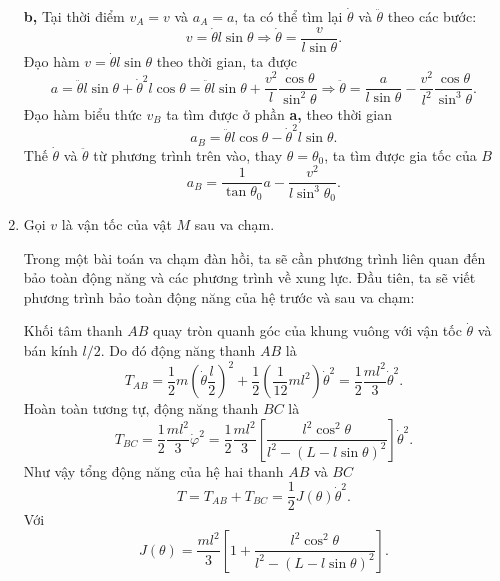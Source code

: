 \begin{enumerate}
\begin{center}
\end{center}
\textbf{b,} Tại thời điểm $v_A=v$ và $a_A=a$, ta có thể tìm lại $\dot{\theta}$ và $\ddot{\theta}$ theo các bước:
\begin{equation} \label{eq1_rectangle_collision}
    v=\dot{\theta} l \sin \theta \Rightarrow \dot{\theta}= \dfrac{v}{l \sin \theta}.
\end{equation}
Đạo hàm $v=\dot{\theta} l \sin \theta$ theo thời gian, ta được
\begin{equation} \label{eq2_rectangle_collision}
    a = \ddot{\theta} l \sin \theta + \dot{\theta}^2 l \cos \theta = \ddot{\theta} l \sin \theta + \dfrac{v^2}{l} \dfrac{\cos \theta}{\sin^2 \theta} \Rightarrow \ddot{\theta}= \dfrac{a}{l \sin \theta} - \dfrac{v^2}{l^2} \dfrac{\cos \theta}{\sin^3 \theta}.
\end{equation}
Đạo hàm biểu thức $v_B$ ta tìm được ở phần \textbf{a,} theo thời gian
\begin{equation} \label{eq3_rectangle_collision}
    a_B = \ddot{\theta} l \cos \theta - \dot{\theta}^2 l \sin \theta.
\end{equation}
Thế $\dot{\theta}$ và $\ddot{\theta}$ từ phương trình trên vào, thay $\theta=\theta_0$, ta tìm được gia tốc của $B$
\begin{equation} \label{eq4_rectangle_collision}
    a_B = \dfrac{1}{\tan \theta_0} a - \dfrac{v^2}{l \sin^3 \theta_0}.
\end{equation}

\item Gọi $v$ là vận tốc của vật $M$ sau va chạm. 

Trong một bài toán va chạm đàn hồi, ta sẽ cần phương trình liên quan đến bảo toàn động năng và các phương trình về xung lực. Đầu tiên, ta sẽ viết phương trình bảo toàn động năng của hệ trước và sau va chạm:

Khối tâm thanh $AB$ quay tròn quanh góc của khung vuông với vận tốc $\dot{\theta}$ và bán kính $l/2$. Do đó động năng thanh $AB$ là
\begin{equation} \label{eq5_rectangle_collision}
    T_{AB} = \dfrac{1}{2} m \left( \dot{\theta} \dfrac{l}{2} \right)^2 + \dfrac{1}{2} \left( \dfrac{1}{12} m l^2 \right) \dot{\theta}^2 = \dfrac{1}{2} \dfrac{ml^2}{3} \dot{\theta}^2.
\end{equation}
Hoàn toàn tương tự, động năng thanh $BC$ là 
\begin{equation} \label{eq6_rectangle_collision}
    T_{BC} = \dfrac{1}{2} \dfrac{ml^2}{3} \dot{\varphi}^2= \dfrac{1}{2} \dfrac{ml^2}{3} \left[ \dfrac{l^2 \cos^2 \theta}{l^2 - \left( L - l \sin \theta \right)^2} \right] \dot{\theta}^2.
\end{equation}
Như vậy tổng động năng của hệ hai thanh $AB$ và $BC$
\begin{equation} \label{eq7_rectangle_collision}
    T = T_{AB} + T_{BC} = \dfrac{1}{2} J(\theta) \dot{\theta}^2. 
\end{equation}
Với
\begin{equation} \label{eq8_rectangle_collision}
    J(\theta) = \dfrac{m l^2}{3} \left[ 1 + \dfrac{l^2 \cos^2 \theta}{l^2 - \left( L - l \sin \theta \right)^2} \right].
\end{equation}


\end{enumerate}
